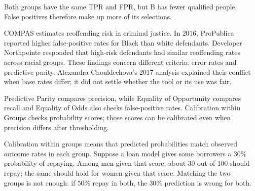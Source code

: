 
Both groups have the same TPR and FPR, but B has fewer qualified people. False positives therefore make up more of its selections.

{COMPAS estimates reoffending risk in criminal justice. In $2016$, ProPublica reported higher false-positive rates for Black than white defendants. Developer Northpointe responded that high-risk defendants had similar reoffending rates across racial groups. These findings concern different criteria: error rates and predictive parity. Alexandra Chouldechova's $2017$ analysis explained their conflict when base rates differ; it did not settle whether the tool or its use was fair.}

\metricsecondary

Predictive Parity compares precision, while Equality of Opportunity compares recall and Equality of Odds also checks false-positive rates. Calibration within Groups checks probability scores; those scores can be calibrated even when precision differs after thresholding.

\metricend
\clearpage
\thispagestyle{biasfairnesstyle}
\label{sec:calibration-within-groups}

Calibration within groups means that predicted probabilities match observed outcome rates in each group. Suppose a loan model gives some borrowers a $30\%$ probability of repaying. Among men given that score, about $30$ out of $100$ should repay; the same should hold for women given that score. Matching the two groups is not enough: if $50\%$ repay in both, the $30\%$ prediction is wrong for both.

\begin{metricformula}
\end{metricformula}

